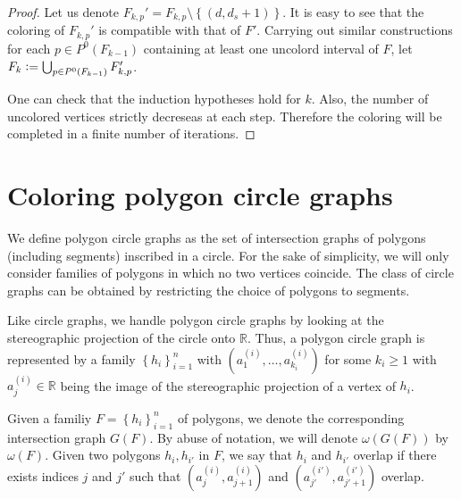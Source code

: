 \documentclass[12pt]{article}
\theoremstyle{definition}
\newcommand{\defeq}{\vcentcolon=}
\begin{document}
\begin{proof}
        Let us denote $F_{k, p}' = 
        F_{k, p} \setminus \left\{
        \left(d, d_{s} + 1\right)\right\}$.
        It is easy to see that the coloring of
        $F_{k, p}'$ is compatible
        with that of
        $F'$.
        Carrying out similar constructions
        for each $p \in P^{0}\left(F_{k-1}\right)$
        containing at least one uncolord
        interval of $F$, let
        $F_{k} \defeq \bigcup_{p \in 
        P^{0}\left(F_{k-1}\right)} F_{k, p}'$.

        One can check that the 
        induction hypotheses hold
        for $k$.
        Also, the number of uncolored
        vertices strictly decreseas 
        at each step. Therefore
        the coloring will be 
        completed in a finite
        number of iterations.
    \end{proof}
    
    \section{Coloring polygon circle graphs}

    We define polygon circle
    graphs as the set of intersection
    graphs of polygons
    (including segments)
    inscribed in a circle.
    For the sake of simplicity,
    we will only consider
    families of polygons
    in which no two
    vertices coincide.
    The class of circle
    graphs can be obtained
    by restricting the
    choice of polygons
    to segments.

    Like circle graphs, we
    handle polygon
    circle graphs by looking
    at the stereographic projection
    of the circle onto $\mathbb{R}$.
    Thus, a polygon circle
    graph is represented by a 
    family $\left\{h_{i}\right\}_{i=1}^{n}$
    with 
    $\left(a_{1}^{\left(i\right)},
    \ldots, a_{k_{i}}^{\left(i\right)}\right)$ 
    for some $k_{i} \geq 1$ 
    with $a^{\left(i\right)}_{j} \in \mathbb{R}$
    being the image of
    the stereographic projection
    of a vertex of $h_{i}$.

    Given a familiy
    $F = \left\{h_{i}\right\}_{i=1}^{n}$ 
    of polygons, we denote
    the corresponding
    intersection graph $G\left(F\right)$.
    By abuse of notation,
    we will denote
    $\omega\left(G\left(F\right)\right)$ 
    by $\omega\left(F\right)$.
    Given two polygons
    $h_{i}, h_{i'}$ in $F$,
    we say that $h_{i}$ and
    $h_{i'}$ overlap 
    if there exists indices 
    $j$ and $j'$ such that
    $\left(a_{j}^{\left(i\right)},
     a_{j+1}^{\left(i\right)}\right)$ 
     and $\left(a_{j'}^{\left(i'\right)},
     a_{j'+1}^{\left(i'\right)}\right)$ 
     overlap.
\end{document}
